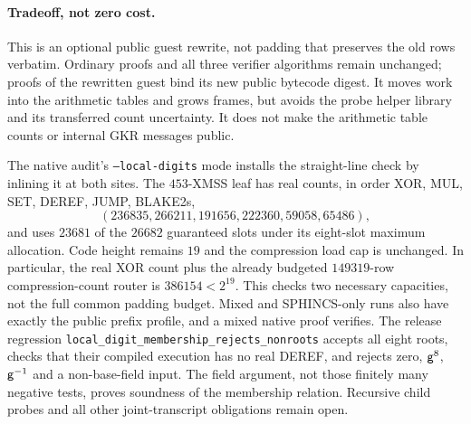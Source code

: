\paragraph{Tradeoff, not zero cost.} This is an optional public guest rewrite, not padding that preserves the old rows verbatim. Ordinary proofs and all three verifier algorithms remain unchanged; proofs of the rewritten guest bind its new public bytecode digest. It moves work into the arithmetic tables and grows frames, but avoids the probe helper library and its transferred count uncertainty. It does not make the arithmetic table counts or internal GKR messages public.

The native audit's \texttt{--local-digits} mode installs the straight-line check by inlining it at both sites. The $453$-XMSS leaf has real counts, in order XOR, MUL, SET, DEREF, JUMP, BLAKE2s,
\[
 (236835,266211,191656,222360,59058,65486),
\]
and uses $23681$ of the $26682$ guaranteed slots under its eight-slot maximum allocation. Code height remains $19$ and the compression load cap is unchanged. In particular, the real XOR count plus the already budgeted $149319$-row compression-count router is $386154<2^{19}$. This checks two necessary capacities, not the full common padding budget. Mixed and SPHINCS-only runs also have exactly the public prefix profile, and a mixed native proof verifies. The release regression \texttt{local\_digit\_membership\_rejects\_nonroots} accepts all eight roots, checks that their compiled execution has no real DEREF, and rejects zero, $\mathsf{g}^8$, $\mathsf{g}^{-1}$ and a non-base-field input. The field argument, not those finitely many negative tests, proves soundness of the membership relation. Recursive child probes and all other joint-transcript obligations remain open.
